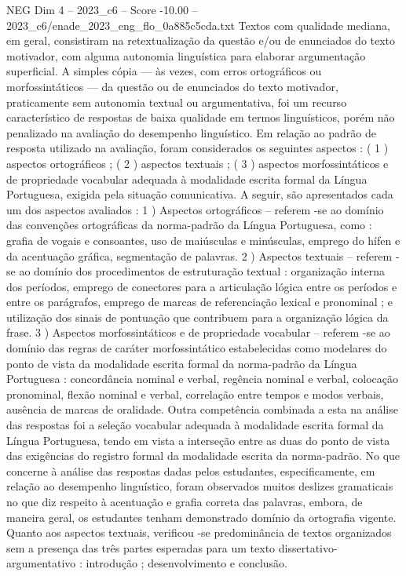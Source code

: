 \begin{textsample}{NEG Dim 4 – 2023\_c6 – Score -10.00 – 2023\_c6/enade\_2023\_eng\_flo\_0a885c5cda.txt}
Textos com qualidade mediana, em geral, consistiram na retextualização da questão e/ou de enunciados do texto motivador, com alguma autonomia linguística para elaborar argumentação superficial.
A simples cópia — às vezes, com erros ortográficos ou morfossintáticos — da questão ou de enunciados do texto motivador, praticamente sem autonomia textual ou argumentativa, foi um recurso característico de respostas de baixa qualidade em termos linguísticos, porém não penalizado na avaliação do desempenho linguístico.
Em relação ao padrão de resposta utilizado na avaliação, foram considerados os seguintes aspectos : ( 1 ) aspectos ortográficos ; ( 2 ) aspectos textuais ; ( 3 ) aspectos morfossintáticos e de propriedade vocabular adequada à modalidade escrita formal da Língua Portuguesa, exigida pela situação comunicativa.
A seguir, são apresentados cada um dos aspectos avaliados : 1 ) Aspectos ortográficos – referem -se ao domínio das convenções ortográficas da norma-padrão da Língua Portuguesa, como : grafia de vogais e consoantes, uso de maiúsculas e minúsculas, emprego do hífen e da acentuação gráfica, segmentação de palavras. 2 ) Aspectos textuais – referem -se ao domínio dos procedimentos de estruturação textual : organização interna dos períodos, emprego de conectores para a articulação lógica entre os períodos e entre os parágrafos, emprego de marcas de referenciação lexical e pronominal ; e utilização dos sinais de pontuação que contribuem para a organização lógica da frase. 3 ) Aspectos morfossintáticos e de propriedade vocabular – referem -se ao domínio das regras de caráter morfossintático estabelecidas como modelares do ponto de vista da modalidade escrita formal da norma-padrão da Língua Portuguesa : concordância nominal e verbal, regência nominal e verbal, colocação pronominal, flexão nominal e verbal, correlação entre tempos e modos verbais, ausência de marcas de oralidade.
Outra competência combinada a esta na análise das respostas foi a seleção vocabular adequada à modalidade escrita formal da Língua Portuguesa, tendo em vista a interseção entre as duas do ponto de vista das exigências do registro formal da modalidade escrita da norma-padrão.
No que concerne à análise das respostas dadas pelos estudantes, especificamente, em relação ao desempenho linguístico, foram observados muitos deslizes gramaticais no que diz respeito à acentuação e grafia correta das palavras, embora, de maneira geral, os estudantes tenham demonstrado domínio da ortografia vigente.
Quanto aos aspectos textuais, verificou -se predominância de textos organizados sem a presença das três partes esperadas para um texto dissertativo-argumentativo : introdução ; desenvolvimento e conclusão.

\end{textsample}
